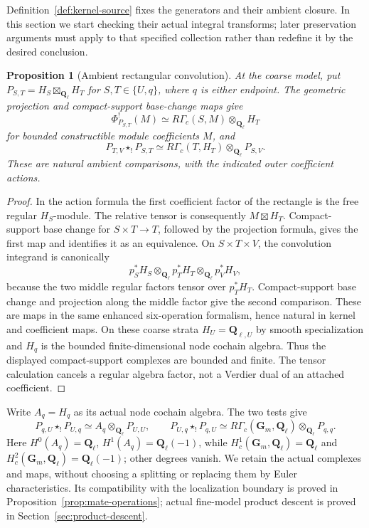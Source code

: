 \documentclass[11pt]{article}
\newtheorem{proposition}{Proposition}[section]
\theoremstyle{definition}
\theoremstyle{remark}
\newcommand{\Q}{\mathbf Q_\ell}
\begin{document}
Definition~\ref{def:kernel-source} fixes the generators and their
ambient closure.  In this section we start checking their actual
integral transforms; later preservation arguments must apply to
that specified collection rather than redefine it by the desired
conclusion.

\begin{proposition}[Ambient rectangular convolution]\label{prop:rectangle}
At the coarse model, put $P_{S,T}=H_S\boxtimes_{\Q}H_T$ for
$S,T\in\{U,q\}$, where $q$ is either endpoint.  The geometric
projection and compact-support base-change maps give
\[
 \Phi^!_{P_{S,T}}(M)\simeq R\Gamma_c(S,M)\otimes_{\Q}H_T
\]
for bounded constructible module coefficients $M$, and
\[
 P_{T,V}\star_!P_{S,T}
 \simeq R\Gamma_c(T,H_T)\otimes_{\Q}P_{S,V}.
\]
These are natural ambient comparisons, with the indicated outer
coefficient actions.
\end{proposition}
\begin{proof}
In the action formula the first coefficient factor of the rectangle
is the free regular $H_S$-module.  The relative tensor is consequently
$M\boxtimes H_T$.  Compact-support base change for
$S\times T\to T$, followed by the projection formula, gives the first
map and identifies it as an equivalence.
On $S\times T\times V$, the convolution integrand is canonically
\[
 p_S^*H_S\otimes_{\Q}p_T^*H_T\otimes_{\Q}p_V^*H_V,
\]
because the two middle regular factors tensor over $p_T^*H_T$.
Compact-support base change and projection along the middle factor
give the second comparison.  These are maps in the same enhanced
six-operation formalism, hence natural in kernel and coefficient maps.
On these coarse strata $H_U=\mathbf Q_{\ell,U}$ by smooth specialization and
$H_q$ is the bounded finite-dimensional node cochain algebra.
Thus the displayed compact-support complexes are bounded and finite.
The tensor calculation cancels a regular algebra factor, not a
Verdier dual of an attached coefficient.
\end{proof}

Write $A_q=H_q$ as its actual node cochain algebra.  The two tests give
\[
 P_{q,U}\star_!P_{U,q}\simeq A_q\otimes_{\Q}P_{U,U},\qquad
 P_{U,q}\star_!P_{q,U}\simeq
 R\Gamma_c(\mathbf G_m,\Q)\otimes_{\Q}P_{q,q}.
\]
Here $H^0(A_q)=\Q$, $H^1(A_q)=\Q(-1)$, while
$H_c^1(\mathbf G_m,\Q)=\Q$ and
$H_c^2(\mathbf G_m,\Q)=\Q(-1)$; other degrees vanish.
We retain the actual complexes and maps, without choosing a splitting
or replacing them by Euler characteristics.  Its compatibility with the localization boundary is proved in
Proposition~\ref{prop:mate-operations}; actual fine-model product
descent is proved in Section~\ref{sec:product-descent}.
\end{document}
